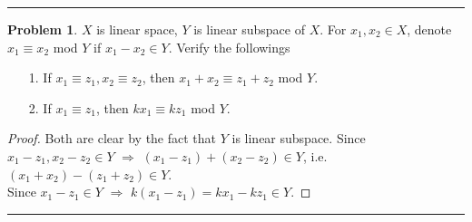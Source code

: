 \documentclass[a4paper, 10pt]{article}
\theoremstyle{definition}
\newtheorem{problem}{Problem}
\theoremstyle{hSol}
\begin{document}
\noindent\rule{16cm}{0.4pt}

\begin{problem} $X$ is linear space, $Y$ is linear subspace of $X$. For $x_1, x_2 \in X$, denote $x_1 \equiv x_2$ mod $Y$ if $x_1-x_2 \in Y$. Verify the followings
\begin{itemize}
  \item[1.] If $x_1 \equiv z_1, x_2 \equiv z_2$, then $x_1+x_2 \equiv z_1+z_2$ mod $Y$.
  \item[2.] If $x_1 \equiv z_1$, then $kx_1 \equiv kz_1$ mod $Y$.
\end{itemize}
\end{problem}
\begin{proof} Both are clear by the fact that $Y$ is linear subspace. Since $x_1-z_1, x_2-z_2 \in Y$ $\Rightarrow$ $(x_1-z_1)+(x_2-z_2)\in Y$, i.e. $(x_1+x_2)-(z_1+z_2) \in Y$.\\
Since $x_1-z_1 \in Y$ $\Rightarrow$ $k(x_1-z_1)=kx_1-kz_1\in Y$.
\end{proof}

\noindent\rule{16cm}{0.4pt}
\end{document}
